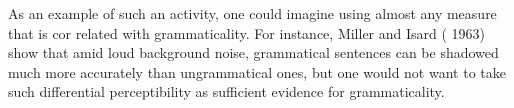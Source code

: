 \begin{listWWNumlvleveli}
\item 
\setcounter{listWWNumlvlevelii}{1}
\begin{listWWNumlvlevelii}
\item 
\setcounter{listWWNumlvleveliii}{0}
\begin{listWWNumlvleveliii}
\item 
\begin{styleStandard}
As an example of such an activity, one could imagine using almost any measure that is cor\- related with grammaticality. For instance, Miller and Isard ( 1963) show that amid loud background noise, grammatical sentences can be shadowed much more accurately than ungrammatical ones, but one would not want to take such differential perceptibility as sufficient evidence for grammaticality.
\end{styleStandard}


\end{listWWNumlvleveliii}
\end{listWWNumlvlevelii}
\end{listWWNumlvleveli}
